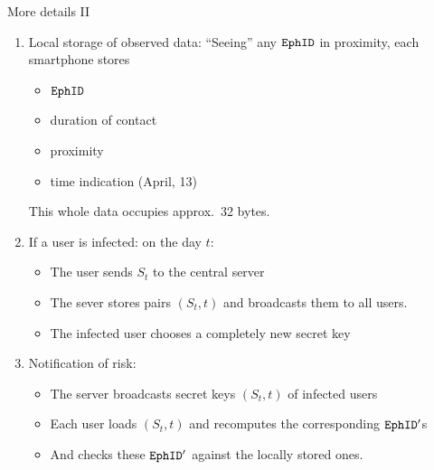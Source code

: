 \documentclass[usenames,dvipsnames, 9pt]{beamer}
\begin{document}
\begin{frame}{More details II}
\begin{enumerate}
	\itemsep 1em
	\setcounter{enumi}{2}
	\item {\color{Orange} Local storage of observed data:}
	``Seeing'' any $\mathtt{EphID}$ in proximity, each smartphone stores
	\begin{itemize}
		\item $\mathtt{EphID}$ 
		\item duration of contact
		\item proximity
		\item time indication (April, 13)
	\end{itemize} 
This whole data occupies approx.\ 32 bytes.
\pause
	\item {\color{Orange} If a user is infected:} on the day $t$:	
	\begin{itemize}
	\item The user sends $S_t$ to the central server 
	\item The sever stores pairs $(S_t, t)$ and broadcasts them to all users.
	\item The infected user chooses a completely new secret key 
	\end{itemize}
\pause
\item {\color{Orange} Notification of risk:} 	\\
	\begin{itemize}
		\item The server broadcasts secret keys $(S_t,t)$ of infected users
		\item Each user loads $(S_t,t)$  and recomputes the corresponding $\mathtt{EphID}'$s
		\item And checks these $\mathtt{EphID}'$ against the locally stored ones. 
	\end{itemize}
\end{enumerate}
\end{frame}
\end{document}
